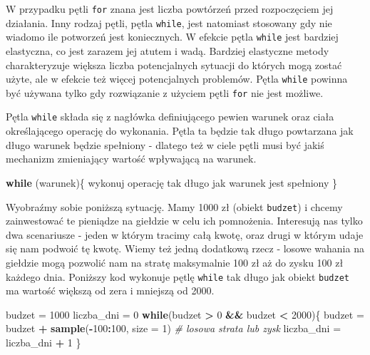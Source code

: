 \documentclass[paper=6in:9in,pagesize=pdftex,headinclude=on,footinclude=on,10pt]{scrbook}
\newenvironment{Shaded}{\begin{snugshade}}{\end{snugshade}}
\newcommand{\CommentTok}[1]{\textcolor[rgb]{0.56,0.35,0.01}{\textit{#1}}}
\newcommand{\ControlFlowTok}[1]{\textcolor[rgb]{0.13,0.29,0.53}{\textbf{#1}}}
\newcommand{\DataTypeTok}[1]{\textcolor[rgb]{0.13,0.29,0.53}{#1}}
\newcommand{\DecValTok}[1]{\textcolor[rgb]{0.00,0.00,0.81}{#1}}
\newcommand{\KeywordTok}[1]{\textcolor[rgb]{0.13,0.29,0.53}{\textbf{#1}}}
\newcommand{\NormalTok}[1]{#1}
\newcommand{\OperatorTok}[1]{\textcolor[rgb]{0.81,0.36,0.00}{\textbf{#1}}}
\newcommand{\StringTok}[1]{\textcolor[rgb]{0.31,0.60,0.02}{#1}}
\begin{document}
W przypadku pętli \texttt{for} znana jest liczba powtórzeń przed rozpoczęciem jej działania.
Inny rodzaj pętli, pętla \texttt{while}, jest natomiast stosowany gdy nie wiadomo ile potworzeń jest koniecznych.
W efekcie pętla \texttt{while} jest bardziej elastyczna, co jest zarazem jej atutem i wadą.
Bardziej elastyczne metody charakteryzuje większa liczba potencjalnych sytuacji do których mogą zostać użyte, ale w efekcie też więcej potencjalnych problemów.
Pętla \texttt{while} powinna być używana tylko gdy rozwiązanie z użyciem pętli \texttt{for} nie jest możliwe.

Pętla \texttt{while} składa się z nagłówka definiującego pewien warunek oraz ciała określającego operację do wykonania.
Pętla ta będzie tak długo powtarzana jak długo warunek będzie spełniony - dlatego też w ciele pętli musi być jakiś mechanizm zmieniający wartość wpływającą na warunek.

\begin{Shaded}
\begin{Highlighting}[]
\ControlFlowTok{while}\NormalTok{ (warunek)\{}
\NormalTok{    wykonuj operację tak długo jak warunek jest spełniony}
\NormalTok{\}}
\end{Highlighting}
\end{Shaded}

Wyobraźmy sobie poniższą sytuację.
Mamy 1000 zł (obiekt \texttt{budzet}) i chcemy zainwestować te pieniądze na giełdzie w celu ich pomnożenia.
Interesują nas tylko dwa scenariusze - jeden w którym tracimy całą kwotę, oraz drugi w którym udaje się nam podwoić tę kwotę.
Wiemy też jedną dodatkową rzecz - losowe wahania na giełdzie mogą pozwolić nam na stratę maksymalnie 100 zł aż do zysku 100 zł każdego dnia.
Poniższy kod wykonuje pętlę \texttt{while} tak długo jak obiekt \texttt{budzet} ma wartość większą od zera i mniejszą od 2000.

\begin{Shaded}
\begin{Highlighting}[]
\NormalTok{budzet =}\StringTok{ }\DecValTok{1000}
\NormalTok{liczba_dni =}\StringTok{ }\DecValTok{0}
\ControlFlowTok{while}\NormalTok{(budzet }\OperatorTok{>}\StringTok{ }\DecValTok{0} \OperatorTok{&&}\StringTok{ }\NormalTok{budzet }\OperatorTok{<}\StringTok{ }\DecValTok{2000}\NormalTok{)\{}
\NormalTok{  budzet =}\StringTok{ }\NormalTok{budzet }\OperatorTok{+}\StringTok{ }\KeywordTok{sample}\NormalTok{(}\OperatorTok{-}\DecValTok{100}\OperatorTok{:}\DecValTok{100}\NormalTok{, }\DataTypeTok{size =} \DecValTok{1}\NormalTok{) }\CommentTok{# losowa strata lub zysk}
\NormalTok{  liczba_dni =}\StringTok{ }\NormalTok{liczba_dni }\OperatorTok{+}\StringTok{ }\DecValTok{1}
\NormalTok{\}}
\end{Highlighting}
\end{Shaded}
\end{document}
